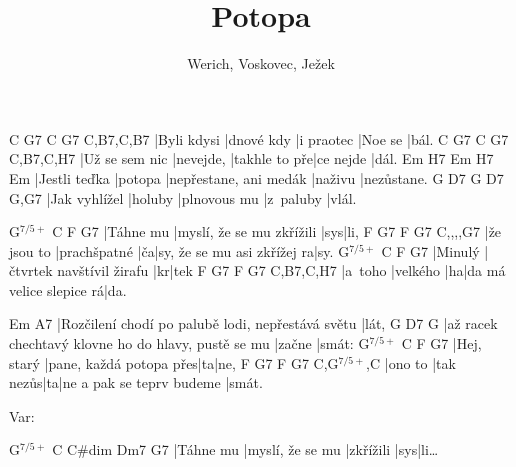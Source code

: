 \documentclass{song}
\title{Potopa}
\author{Werich, Voskovec, Ježek}
\newcommand{\aug}{$^{7/5+}$}
\begin{document}
\strophe
C           G7         C          G7      C,B7,C,B7
|Byli kdysi |dnové kdy |i praotec |Noe se |bál.
C              G7        C             G7        C,B7,C,H7
|Už se sem nic |nevejde, |takhle to pře|ce nejde |dál.
Em            H7      Em                     H7      Em
|Jestli teďka |potopa |nepřestane, ani medák |naživu |nezůstane.
G             D7      G            D7        G,G7
|Jak vyhlížel |holuby |plnovous mu |z~paluby |vlál.
\endstrophe

\strophe
{G\aug}     C                       F   G7
|Táhne mu |myslí, že se mu zkřížili |sys|li,
F           G7           F  G7                          C,,,,G7
|že jsou to |prachšpatné |ča|sy, že se mu asi zkřížej ra|sy.
{G\aug} C                         F  G7
|Minulý |čtvrtek navštívil žirafu |kr|tek
F       G7       F  G7                      C,B7,C,H7
|a~toho |velkého |ha|da má velice slepice rá|da.
\endstrophe

\strophe
Em                                                A7
|Rozčilení chodí po palubě lodi, nepřestává světu |lát,
G                                                   D7     G
|až racek chechtavý klovne ho do hlavy, pustě se mu |začne |smát:
{G\aug}     C                       F  G7
|Hej, starý |pane, každá potopa přes|ta|ne,
F       G7        F  G7                        C,G\aug,C
|ono to |tak nezůs|ta|ne a pak se teprv budeme |smát.
\endstrophe


Var:

\strophe
{G\aug}   C                C\#dim    Dm7 G7
|Táhne mu |myslí, že se mu |zkřížili |sys|li\ldots
\endstrophe
\end{document}
